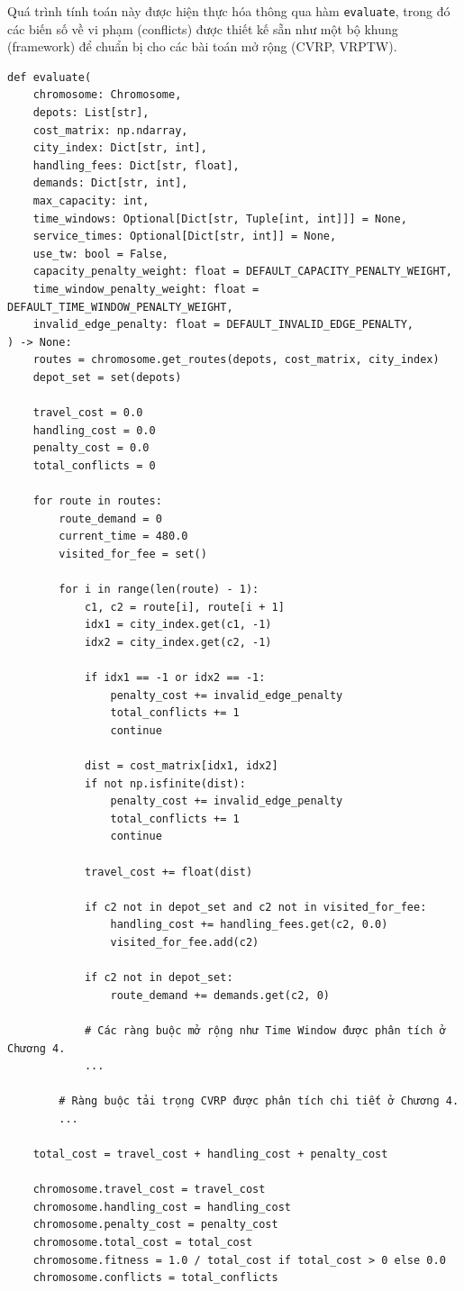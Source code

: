 \documentclass[12pt,a4paper]{article}
\numberwithin{figure}{subsection}
\numberwithin{table}{subsection}
\newcounter{codecounter}
\newenvironment{codeblock}[2]{%
    \refstepcounter{codecounter}%
    \phantomsection%
    \label{#1}%
    \par\smallskip
}{%
    \par\smallskip
}
\begin{document}
Quá trình tính toán này được hiện thực hóa thông qua hàm \texttt{evaluate}, trong đó các biến số về vi phạm (conflicts) được thiết kế sẵn như một bộ khung (framework) để chuẩn bị cho các bài toán mở rộng (CVRP, VRPTW).
\begin{codeblock}{app:code:evaluate}{Hàm đánh giá cá thể}
\begin{verbatim}
def evaluate(
    chromosome: Chromosome,
    depots: List[str],
    cost_matrix: np.ndarray,
    city_index: Dict[str, int],
    handling_fees: Dict[str, float],
    demands: Dict[str, int],
    max_capacity: int,
    time_windows: Optional[Dict[str, Tuple[int, int]]] = None,
    service_times: Optional[Dict[str, int]] = None,
    use_tw: bool = False,
    capacity_penalty_weight: float = DEFAULT_CAPACITY_PENALTY_WEIGHT,
    time_window_penalty_weight: float = DEFAULT_TIME_WINDOW_PENALTY_WEIGHT,
    invalid_edge_penalty: float = DEFAULT_INVALID_EDGE_PENALTY,
) -> None:
    routes = chromosome.get_routes(depots, cost_matrix, city_index)
    depot_set = set(depots)

    travel_cost = 0.0
    handling_cost = 0.0
    penalty_cost = 0.0
    total_conflicts = 0

    for route in routes:
        route_demand = 0
        current_time = 480.0
        visited_for_fee = set()

        for i in range(len(route) - 1):
            c1, c2 = route[i], route[i + 1]
            idx1 = city_index.get(c1, -1)
            idx2 = city_index.get(c2, -1)

            if idx1 == -1 or idx2 == -1:
                penalty_cost += invalid_edge_penalty
                total_conflicts += 1
                continue

            dist = cost_matrix[idx1, idx2]
            if not np.isfinite(dist):
                penalty_cost += invalid_edge_penalty
                total_conflicts += 1
                continue

            travel_cost += float(dist)

            if c2 not in depot_set and c2 not in visited_for_fee:
                handling_cost += handling_fees.get(c2, 0.0)
                visited_for_fee.add(c2)

            if c2 not in depot_set:
                route_demand += demands.get(c2, 0)

            # Các ràng buộc mở rộng như Time Window được phân tích ở Chương 4.
            ...

        # Ràng buộc tải trọng CVRP được phân tích chi tiết ở Chương 4.
        ...

    total_cost = travel_cost + handling_cost + penalty_cost

    chromosome.travel_cost = travel_cost
    chromosome.handling_cost = handling_cost
    chromosome.penalty_cost = penalty_cost
    chromosome.total_cost = total_cost
    chromosome.fitness = 1.0 / total_cost if total_cost > 0 else 0.0
    chromosome.conflicts = total_conflicts
\end{verbatim}
\end{codeblock}
\end{document}
